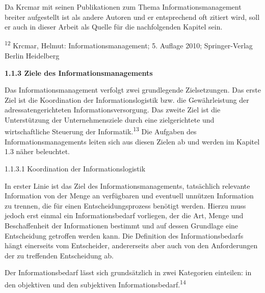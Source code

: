 \documentclass[a4paper]{article}
\begin{document}
{\sffamily\color{black}
Da Krcmar mit seinen Publikationen zum Thema Informationsmanagement breiter aufgestellt ist als andere Autoren und er
entsprechend oft zitiert wird, soll er auch in dieser Arbeit als Quelle für die nachfolgenden Kapitel sein. }


\bigskip


\bigskip


\bigskip


\bigskip


\bigskip


\bigskip


\bigskip


\bigskip


\bigskip


\bigskip

{\sffamily\color{black}
\textsuperscript{12} Krcmar, Helmut: Informationsmanagement; 5. Auflage 2010; Springer-Verlag Berlin Heidelberg}

{\sffamily\bfseries\color{black}
1.1.3 Ziele des Informationsmanagements}


\bigskip

{\sffamily\color{black}
Das Informationsmanagement verfolgt zwei grundlegende Zielsetzungen. Das erste Ziel ist die Koordination der
Informationslogistik bzw. die Gewährleistung der adressatengerichteten Informationsversorgung. Das zweite Ziel ist die
Unterstützung der Unternehmensziele durch eine zielgerichtete und wirtschaftliche Steuerung der
Informatik.\textsuperscript{13} Die Aufgaben des Informationsmanagements leiten sich aus diesen Zielen ab und werden im
Kapitel 1.3 näher beleuchtet.}


\bigskip

{\sffamily\color{black}
1.1.3.1 Koordination der Informationslogistik}


\bigskip

{\sffamily\color{black}
In erster Linie ist das Ziel des Informationsmanagements, tatsächlich relevante Information von der Menge an verfügbaren
und eventuell unnützen Information zu trennen, die für einen Entscheidungsprozess benötigt werden. Hierzu muss jedoch
erst einmal ein Informationsbedarf vorliegen, der die Art, Menge und Beschaffenheit der Informationen bestimmt und auf
dessen Grundlage eine Entscheidung getroffen werden kann. Die Definition des Informationsbedarfs hängt einerseits vom
Entscheider, andererseits aber auch von den Anforderungen der zu treffenden Entscheidung ab.}


\bigskip

{\sffamily\color{black}
Der Informationsbedarf lässt sich grundsätzlich in zwei Kategorien einteilen: in den objektiven und den subjektiven
Informationsbedarf.\textsuperscript{14}}
\end{document}
